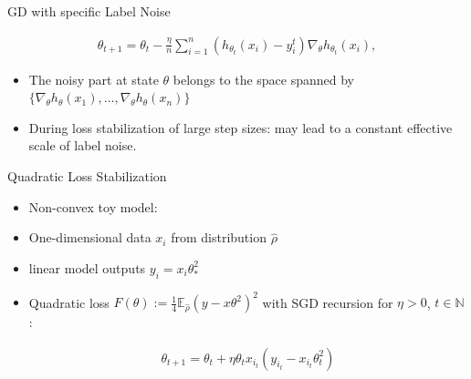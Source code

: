 \documentclass[fleqn]{beamer}
\begin{document}
    \begin{frame}{GD with specific Label Noise}
        \begin{center}
        \begin{minipage}{0.5\textwidth}
            \begin{align*}
                \theta_{t+1} = \theta_t - \frac{\eta}{n} \sum_{i=1}^{n}
                \left( h_{\theta_t}(x_i) - y_i^{t} \right)
                \nabla_{\theta} h_{\theta_t}(x_i),
            \end{align*}
        \end{minipage}
        \end{center}
        \begin{itemize}
            \item The noisy part at state $\theta$ belongs to the space
                spanned by $\{\nabla_\theta
                h_\theta(x_1),\ldots,\nabla_\theta h_\theta(x_n)\} $
            \item During loss stabilization of large step sizes: may lead to
                a constant effective scale of label noise.
        \end{itemize}
    \end{frame}

    \begin{frame}{Quadratic Loss Stabilization}
        \begin{itemize}[<+->]
            \item Non-convex toy model:
            \item One-dimensional data $x_i$ from distribution $\hat{\rho}$
            \item linear model outputs $y_i = x_i \theta_*^{2}$
            \item Quadratic loss $F(\theta) :=
                \frac{1}{4}\mathbb{E}_{\hat{\rho}}(y-x\theta^{2})^{2}$ with
                SGD recursion for $\eta > 0$, $t \in \mathbb{N}$:
        \begin{center}
        \begin{minipage}{0.5\textwidth}
            \begin{align*}
                \theta_{t+1} = \theta_t + \eta \theta_t x_{i_t}(y_{i_t} -
                x_{i_t}\theta^{2}_t)
            \end{align*}
        \end{minipage}
        \end{center}


        \end{itemize}

    \end{frame}
\end{document}
